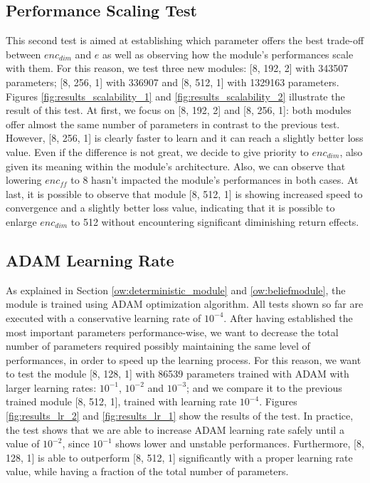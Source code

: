         \subsection{Performance Scaling Test}
            This second test is aimed at establishing which parameter offers the best trade-off between $enc_{dim}$ and $e$ as well as observing how the module's performances scale with them. For this reason, we test three new modules: [8, 192, 2] with 343507 parameters; [8, 256, 1] with 336907 and [8, 512, 1] with 1329163 parameters. Figures \ref{fig:results_scalability_1} and \ref{fig:results_scalability_2} illustrate the result of this test. \newline
            At first, we focus on [8, 192, 2] and [8, 256, 1]: both modules offer almost the same number of parameters in contrast to the previous test. However, [8, 256, 1] is clearly faster to learn and it can reach a slightly better loss value. Even if the difference is not great, we decide to give priority to $enc_{dim}$, also given its meaning within the module's architecture. Also, we can observe that lowering $enc_{ff}$ to 8 hasn't impacted the module's performances in both cases. \newline
            At last, it is possible to observe that module [8, 512, 1] is showing increased speed to convergence and a slightly better loss value, indicating that it is possible to enlarge $enc_{dim}$ to 512 without encountering significant diminishing return effects.
        
        \subsection{ADAM Learning Rate}
            As explained in Section \ref{ow:deterministic_module} and \ref{ow:beliefmodule}, the module is trained using ADAM optimization algorithm. All tests shown so far are executed with a conservative learning rate of $10^{-4}$. After having established the most important parameters performance-wise, we want to decrease the total number of parameters required possibly maintaining the same level of performances, in order to speed up the learning process. For this reason, we want to test the module [8, 128, 1] with 86539 parameters trained with ADAM with larger learning rates: $10^{-1}$, $10^{-2}$ and $10^{-3}$; and we compare it to the previous trained module [8, 512, 1], trained with learning rate $10^{-4}$. Figures \ref{fig:results_lr_2} and \ref{fig:results_lr_1} show the results of the test. \newline
            In practice, the test shows that we are able to increase ADAM learning rate safely until a value of $10^{-2}$, since $10^{-1}$ shows lower and unstable performances. Furthermore, [8, 128, 1] is able to outperform [8, 512, 1] significantly with a proper learning rate value, while having a fraction of the total number of parameters.
            
